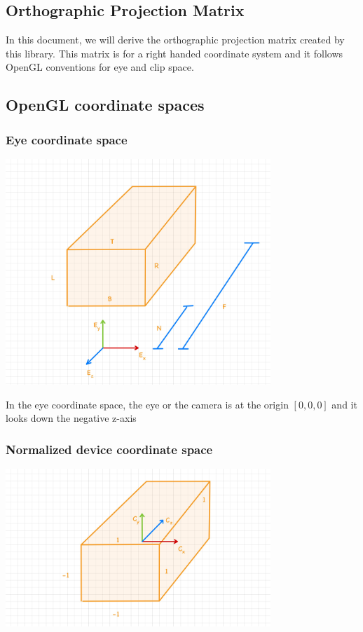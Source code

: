 \documentclass{article}
\begin{document}
    \begin{center}
        \section*{Orthographic Projection Matrix}
    \end{center}

    \noindent In this document, we will derive the orthographic projection matrix created by this library.
    This matrix is for a right handed coordinate system and it follows OpenGL conventions for eye and clip space. \break
    \subsection*{OpenGL coordinate spaces}

    \subsubsection*{Eye coordinate space}
    \includegraphics[width=0.75\textwidth]{../images/OrthoOpenGLEye.jpg}

    \noindent In the eye coordinate space, the eye or the camera is at the origin $[0,0,0]$ and it looks down the negative z-axis
    \subsubsection*{Normalized device coordinate space}
    \includegraphics[width=0.75\textwidth]{../images/OrthoOpenGLClip.jpg}
\end{document}
